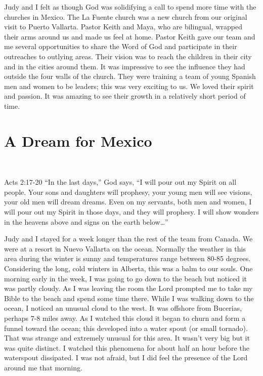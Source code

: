 \documentclass[oneside]{book}
\begin{document}
Judy and I felt as though God was solidifying a call to spend more time with the churches in Mexico. The La Fuente church was a new church from our original visit to Puerto Vallarta. Pastor Keith and Maya, who are bilingual, wrapped their arms around us and made us feel at home. Pastor Keith gave our team and me several opportunities to share the Word of God and participate in their outreaches to outlying areas. Their vision was to reach the children in their city and in the cities around them. It was impressive to see the influence they had outside the four walls of the church. They were training a team of young Spanish men and women to be leaders; this was very exciting to us. We loved their spirit and passion. It was amazing to see their growth in a relatively short period of time. 


\section{A Dream for Mexico}
\

Acts 2:17-20 “In the last days,” God says, “I will pour out my Spirit on all people. Your sons and daughters will prophesy, your young men will see visions, your old men will dream dreams. Even on my servants, both men and women, I will pour out my Spirit in those days, and they will prophesy. I will show wonders in the heavens above and signs on the earth below…”

Judy and I stayed for a week longer than the rest of the team from Canada. We were  at a resort in Nuevo Vallarta on the ocean. Normally the weather in this area during the winter is sunny and temperatures range between 80-85 degrees. Considering the long, cold winters in Alberta, this was a balm to our souls. One morning early in the week, I was going to go down to the beach but noticed it was partly cloudy. As I was leaving the room the Lord prompted me to take my Bible to the beach and spend some time there. While I was walking down to the ocean, I noticed an unusual cloud to the west. It was offshore from Bucerias, perhaps 7-8 miles away. As I watched this cloud it began to churn and form a funnel toward the ocean; this developed into a water spout (or small tornado). That was strange and extremely unusual for this area. It wasn’t very big but it was quite distinct. I watched this phenomena for about half an hour before the waterspout dissipated. I was not afraid, but I did feel the presence of the Lord around me that morning.
\end{document}
